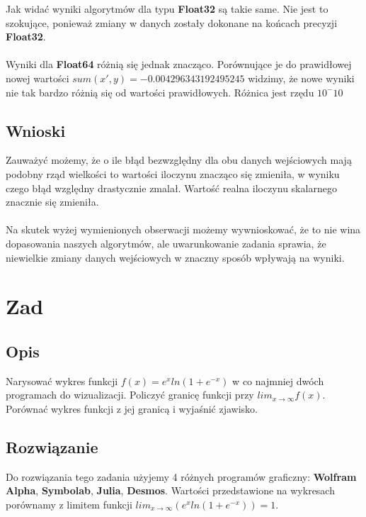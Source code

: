 \documentclass[10pt,a4paper, polish]{article}
\begin{document}
Jak widać wyniki algorytmów dla typu \textbf{Float32} są takie same. Nie jest to szokujące, ponieważ zmiany w danych zostały dokonane na końcach precyzji \textbf{Float32}.\\\\
Wyniki dla \textbf{Float64} różnią się jednak znacząco. Porównujące je do prawidłowej nowej wartości $sum(x',y) = -0.004296343192495245$ widzimy, że nowe wyniki nie tak bardzo różnią się od wartości prawidłowych. Różnica jest rzędu $10^-10$
\subsection*{Wnioski}
Zauważyć możemy, że o ile błąd bezwzględny dla obu danych wejściowych mają podobny rząd wielkości to wartości iloczynu znacząco się zmieniła, w wyniku czego błąd względny drastycznie zmalał. Wartość realna iloczynu skalarnego znacznie się zmieniła.\\\\
Na skutek wyżej wymienionych obserwacji możemy wywnioskować, że to nie wina dopasowania naszych algorytmów, ale uwarunkowanie zadania sprawia, że niewielkie zmiany danych wejściowych w znaczny sposób wpływają na wyniki.
\section{Zad}
\subsection*{Opis}
Narysować wykres funkcji $f(x)=e^{x}ln(1+e^{-x})$ w co najmniej dwóch programach do wizualizacji. Policzyć granicę funkcji przy $lim_{x\rightarrow\infty}f(x)$. Porównać wykres funkcji z jej granicą i wyjaśnić zjawisko.
\subsection*{Rozwiązanie}
Do rozwiązania tego zadania użyjemy 4 różnych programów graficzny: \textbf{Wolfram Alpha}, \textbf{Symbolab}, \textbf{Julia}, \textbf{Desmos}.
Wartości przedstawione na wykresach porównamy z limitem funkcji $lim_{x\rightarrow\infty}(e^{x}ln(1+e^{-x})) = 1$.
\end{document}
